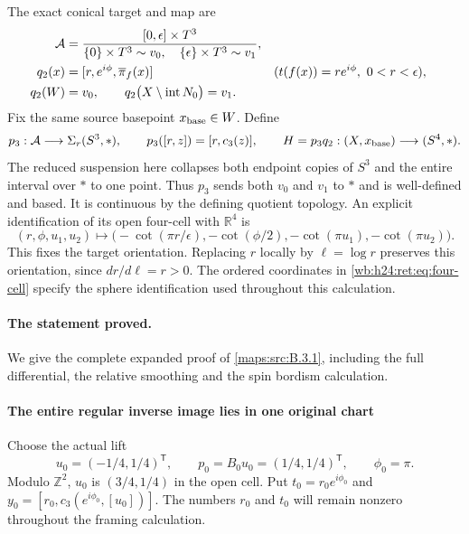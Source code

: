 The exact conical target and map are
\begin{align}
 \mathcal A&=
 \frac{[0,\epsilon]\times T^3}
 {\{0\}\times T^3\sim v_0,\quad
  \{\epsilon\}\times T^3\sim v_1},
 \label{wb:h24:ret:eq:A-target}\\
 q_2(x)&=[r,e^{i\phi},\overline\pi_f(x)]
       &&(t(f(x))=re^{i\phi},\ 0<r<\epsilon),\notag\\
 q_2(W)&=v_0,\qquad
 q_2\bigl(X\setminus\operatorname{int}N_0\bigr)=v_1.
 \label{wb:h24:ret:eq:q2}
\end{align}
Fix the same source basepoint \(x_{\rm base}\in W\).  Define
\begin{equation}
 p_3:\mathcal A\longrightarrow\Sigma_r(S^3,*),\qquad
 p_3([r,z])=[r,c_3(z)],\qquad
 H=p_3q_2:(X,x_{\rm base})\longrightarrow(S^4,*).
 \label{wb:h24:ret:eq:H}
\end{equation}
The reduced suspension here collapses both endpoint copies of \(S^3\)
and the entire interval over \(*\) to one point.  Thus \(p_3\) sends
both \(v_0\) and \(v_1\) to \(*\) and is well-defined and based.
It is continuous by the defining quotient topology.  An explicit
identification of its open four-cell with \(\mathbb R^4\) is
\begin{equation}
 (r,\phi,u_1,u_2)\longmapsto
 \bigl(-\cot(\pi r/\epsilon),-\cot(\phi/2),
       -\cot(\pi u_1),-\cot(\pi u_2)\bigr).
 \label{wb:h24:ret:eq:four-cell}
\end{equation}
This fixes the target orientation.  Replacing \(r\) locally by
\(\ell=\log r\) preserves this orientation, since \(dr/d\ell=r>0\).
The ordered coordinates in \eqref{wb:h24:ret:eq:four-cell} specify the sphere
identification used throughout this calculation.

\paragraph{The statement proved.} We give the complete expanded proof of \cref{maps:src:B.3.1}, including the full differential, the relative smoothing and the spin bordism calculation.


\paragraph{The entire regular inverse image lies in one original chart}

Choose the actual lift
\begin{equation}
 u_0=(-1/4,1/4)^{\mathsf T},\qquad
 p_0=B_0u_0=(1/4,1/4)^{\mathsf T},\qquad \phi_0=\pi.
 \label{wb:h24:ret:eq:chosen-value}
\end{equation}
Modulo \(\mathbb Z^2\), \(u_0\) is \((3/4,1/4)\) in the open cell.  Put
\(t_0=r_0e^{i\phi_0}\) and
\(y_0=[r_0,c_3(e^{i\phi_0},[u_0])]\).  The numbers \(r_0\) and
\(t_0\) will remain nonzero throughout the framing calculation.

